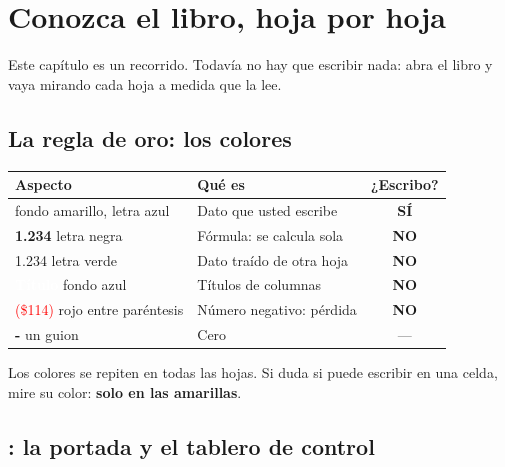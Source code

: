 \chapter{Conozca el libro, hoja por hoja}\label{cap:conozca}

Este capítulo es un recorrido. Todavía no hay que escribir nada: abra el libro y vaya mirando cada hoja a medida que la lee.

\section{La regla de oro: los colores}

\begin{center}
\begin{tabularx}{0.95\linewidth}{@{}lXc@{}}
\toprule
\textbf{Aspecto} & \textbf{Qué es} & \textbf{¿Escribo?} \\ \midrule
\entradaejemplo{} fondo amarillo, letra azul & Dato que usted escribe & \textbf{\color{verde}SÍ} \\
\textbf{1.234} letra negra & Fórmula: se calcula sola & \textbf{\color{rojo}NO} \\
\textcolor{enlace}{1.234} letra verde & Dato traído de otra hoja & \textbf{\color{rojo}NO} \\
\colorbox{azul}{\textcolor{white}{\bfseries Título}} fondo azul & Títulos de columnas & \textbf{\color{rojo}NO} \\
\textcolor{red}{(\$114)} rojo entre paréntesis & Número negativo: pérdida & \textbf{\color{rojo}NO} \\
\textbf{-} un guion & Cero & --- \\
\bottomrule
\end{tabularx}
\end{center}

\begin{nota}
Los colores se repiten en todas las hojas. Si duda si puede escribir en una celda, mire su color: \textbf{solo en las amarillas}.
\end{nota}

\section{: la portada y el tablero de control}


